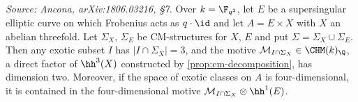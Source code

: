 \begin{lemma}
  \label{lem:exotic-threefold-factor}
  \textit{Source: Ancona, arXiv:1806.03216, §7.}
  Over \(k = \F_{q^2}\), let \(E\) be a supersingular elliptic curve on which
  Frobenius acts as \(q \cdot \id\) and let \(A = E \times X\) with \(X\) an
  abelian threefold. Let \(\Sigma_X\), \(\Sigma_E\) be CM-structures for \(X\),
  \(E\) and put \(\Sigma = \Sigma_X \cup \Sigma_E\). Then any exotic subset \(I\)
  has \(|I \cap \Sigma_X| = 3\), and the motive
  \(\mathcal{M}_{I \cap \Sigma_X} \in \CHM(k)_{\Q}\), a direct factor of
  \(\hh^3(X)\) constructed by \cref{prop:cm-decomposition}, has dimension two.
  Moreover, if the space of exotic classes on \(A\) is four-dimensional, it is
  contained in the four-dimensional motive
  \(\mathcal{M}_{I \cap \Sigma_X} \otimes \hh^1(E)\).
\end{lemma}

